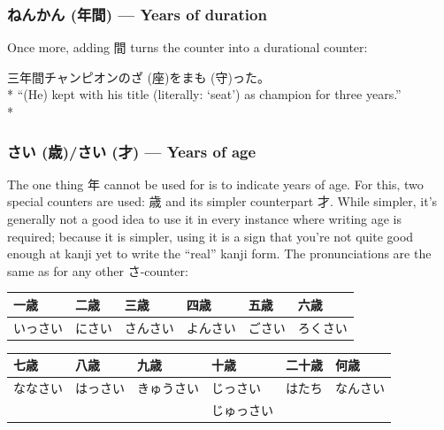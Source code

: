 \documentclass[11pt, b5paper, twoside, openright, onecolumn]{book}
\makeatletter
\newcommand*{\rubystack}[2]{{\relscale{0.5}%
  \begin{tabular}[b]{@{}c@{}}%
    {#1}\\%
   {\textscale{2}{#2}}%
  \end{tabular}}%
}
\DeclareRobustCommand*{\ruby}[2]{%
  \mbox{%
    \setlength{\parskip}{0ex}%
    \BeginAccSupp{method=pdfstringdef,ActualText={#1}}%
      \rubystack{\phantom{#2}}{#1}%
      \llap{%
        \rubystack{#2}{\phantom{#1}}%
      }%
    \EndAccSupp{}%
  }%
}
\renewcommand*{\ruby}[2]{#2 (#1)}%
\newenvironment{exampleblock}{
\setlength{\parindent}{0.6in}
\begin{minipage}[t]{\dimexpr\textwidth-\parindent}}
{\end{minipage}}
\newenvironment{mytabular}[1]{\noindent\hspace{0.4in}
\begin{tabular}[h]{#1}}{\end{tabular}}
\makeatother
\begin{document}
\subsubsection{\ruby{年間}{ねんかん} — Years of duration}

Once more‚ adding 間 turns the counter into a durational counter:

\vspace{0.4cm}
\begin{exampleblock}
三年間チャンピオンの\ruby{座}{ざ}を\ruby{守}{まも}った。 \\* 
“(He) kept with his title (literally: ‘seat’) as champion for three years.” \\* 
\end{exampleblock}
\subsubsection{\ruby{歳}{さい}/\ruby{才}{さい} — Years of age}


The one thing 年 cannot be used for is to indicate years of age. For this‚ two special counters are used: 歳 and its simpler counterpart 才. While simpler‚ it’s generally not a good idea to use it in every instance where writing age is required; because it is simpler‚ using it is a sign that you’re not quite good enough at kanji yet to write the “real” kanji form. The pronunciations are the same as for any other さ-counter:

\vspace{0.5cm}
\smaller
\begin{mytabular}{| l  l  l  l  l  l |}\hline 
\rule{0pt}{2.4ex}一歳 & 二歳 & 三歳 & 四歳 & 五歳 & 六歳\\ 
\hline
\rule{0pt}{2.4ex}いっさい & にさい & さんさい & よんさい & ごさい & ろくさい\\ 
\hline 
\end{mytabular}
\larger
\vspace{0.5cm}

\smaller
\begin{mytabular}{| l  l  l  l  l  l |}\hline 
\rule{0pt}{2.4ex}七歳 & 八歳 & 九歳 & 十歳 & 二十歳 & 何歳\\ 
\hline
\rule{0pt}{2.4ex}ななさい & はっさい & きゅうさい & じっさい & はたち & なんさい\\ 
\rule{0pt}{2.4ex} &  &  & じゅっさい &  & \\ 
\hline 
\end{mytabular}
\larger
\vspace{0.5cm}
\end{document}
